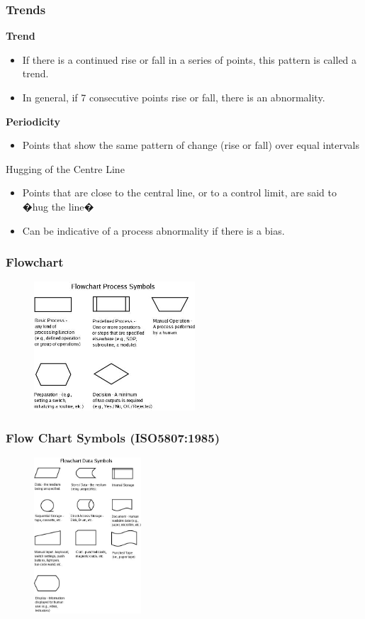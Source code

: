 \begin{frame}
\frametitle{Trends}
\textbf{Trend}
\begin{itemize}
	\item If there is a continued rise or fall in a series of points, this pattern is called a trend.
	\item In general, if 7 consecutive points rise or fall, there is an abnormality.
\end{itemize}
\textbf{Periodicity}
\begin{itemize}
	\item Points that show the same pattern of change (rise or fall) over equal intervals
\end{itemize}
Hugging of the Centre Line
\begin{itemize}
	\item Points that are close to the central line, or to a control limit, are said to �hug the line�
	\item Can be indicative of a process abnormality if there is a bias.
\end{itemize}
\end{frame}




\begin{frame}
\frametitle{Flowchart}
\begin{figure}
	\centering
		\includegraphics[width = 6cm]{images/flow1.jpg}
	\label{fig:flow1}
\end{figure}
\end{frame}




\begin{frame}
\frametitle{Flow Chart Symbols  (ISO5807:1985) }
\begin{figure}
	\centering
		\includegraphics[width = 4cm]{images/flow2.jpg}
	\label{fig:flow2}
\end{figure}

\end{frame}




